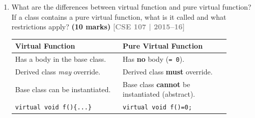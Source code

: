 \documentclass[12pt,a3paper]{article}
\newcommand{\yr}[1]{\hfill\textcolor{gray}{\small\textbf{[#1]}}}
\newcommand{\mk}[1]{\textcolor{orange!70!black}{\small\textbf{(#1 marks)}}}
\begin{document}
\begin{enumerate}
\begin{tcolorbox}
\textbf{Type of inheritance:} \textbf{Multiple inheritance} (diamond
pattern) --- \texttt{man} and \texttt{monkey} both inherit
\texttt{hand}; \texttt{animal} inherits both, making it a
\emph{diamond hierarchy}.

\textbf{Problem:} \texttt{animal} inherits \textbf{two copies} of
\texttt{hand} --- one via \texttt{man} and one via \texttt{monkey}.
Any reference to \texttt{hand}'s members inside \texttt{animal} is
\textbf{ambiguous}.

\textbf{Solution --- virtual base class:}

\begin{lstlisting}[language=C++]
class hand {
public:
    void wave() { cout << "Hand waves\n"; }
};
class man    : virtual public hand {};
class monkey : virtual public hand {};
class animal : public man, public monkey {};

int main() {
    animal a;
    a.wave();   // no ambiguity -- one shared copy of hand
}
\end{lstlisting}

\end{tcolorbox}

\item What are the differences between virtual function and pure virtual function? If a class contains a pure virtual function, what is it called and what restrictions apply? \mk{10}
\yr{CSE 107 | 2015--16}

\begin{tcolorbox}[enhanced,breakable,ansbox,colback=cG!4,colframe=cG,
  boxrule=0.8pt,arc=5pt,
  title={\textbf{Answer --- Virtual vs pure virtual function; abstract class restrictions}},
  fonttitle=\bfseries\color{white},colbacktitle=cG]

\begin{center}
\small
\begin{tabular}{@{}p{0.44\linewidth}p{0.44\linewidth}@{}}
\toprule
\textbf{Virtual Function} & \textbf{Pure Virtual Function} \\
\midrule
Has a body in the base class. &
Has \textbf{no} body (\texttt{= 0}). \\[3pt]
Derived class \emph{may} override. &
Derived class \textbf{must} override. \\[3pt]
Base class can be instantiated. &
Base class \textbf{cannot} be instantiated (abstract). \\[3pt]
\texttt{virtual void f()\{...\}} &
\texttt{virtual void f()=0;} \\
\bottomrule
\end{tabular}
\end{center}


\end{tcolorbox}
\end{enumerate}
\end{document}
